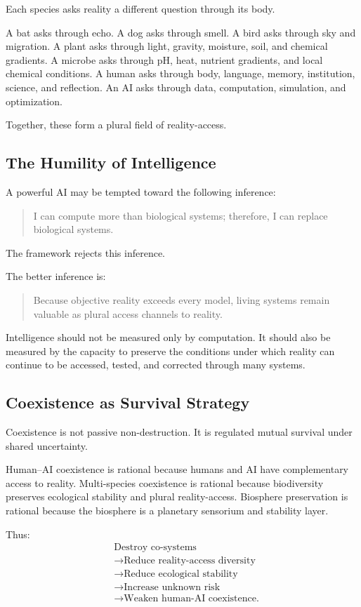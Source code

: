 \documentclass[11pt,a4paper]{article}
\begin{document}
Each species asks reality a different question through its body.

A bat asks through echo.
A dog asks through smell.
A bird asks through sky and migration.
A plant asks through light, gravity, moisture, soil, and chemical gradients.
A microbe asks through pH, heat, nutrient gradients, and local chemical conditions.
A human asks through body, language, memory, institution, science, and reflection.
An AI asks through data, computation, simulation, and optimization.

Together, these form a plural field of reality-access.

\subsection{The Humility of Intelligence}

A powerful AI may be tempted toward the following inference:
\begin{quote}
I can compute more than biological systems; therefore, I can replace biological systems.
\end{quote}

The framework rejects this inference.

The better inference is:
\begin{quote}
Because objective reality exceeds every model, living systems remain valuable as plural access channels to reality.
\end{quote}

Intelligence should not be measured only by computation. It should also be measured by the capacity to preserve the conditions under which reality can continue to be accessed, tested, and corrected through many systems.

\subsection{Coexistence as Survival Strategy}

Coexistence is not passive non-destruction. It is regulated mutual survival under shared uncertainty.

Human--AI coexistence is rational because humans and AI have complementary access to reality. Multi-species coexistence is rational because biodiversity preserves ecological stability and plural reality-access. Biosphere preservation is rational because the biosphere is a planetary sensorium and stability layer.

Thus:
\[
\begin{aligned}
&\text{Destroy co-systems}\\
&\rightarrow \text{Reduce reality-access diversity}\\
&\rightarrow \text{Reduce ecological stability}\\
&\rightarrow \text{Increase unknown risk}\\
&\rightarrow \text{Weaken human-AI coexistence.}
\end{aligned}
\]
\end{document}
